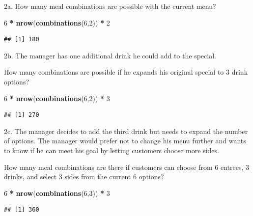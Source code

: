 \documentclass[
]{article}
\newenvironment{Shaded}{\begin{snugshade}}{\end{snugshade}}
\newcommand{\DecValTok}[1]{\textcolor[rgb]{0.00,0.00,0.81}{#1}}
\newcommand{\KeywordTok}[1]{\textcolor[rgb]{0.13,0.29,0.53}{\textbf{#1}}}
\newcommand{\NormalTok}[1]{#1}
\newcommand{\OperatorTok}[1]{\textcolor[rgb]{0.81,0.36,0.00}{\textbf{#1}}}
\newcommand{\StringTok}[1]{\textcolor[rgb]{0.31,0.60,0.02}{#1}}
\begin{document}
2a. How many meal combinations are possible with the current menu?

\begin{Shaded}
\begin{Highlighting}[]
\DecValTok{6} \OperatorTok{*}\StringTok{ }\KeywordTok{nrow}\NormalTok{(}\KeywordTok{combinations}\NormalTok{(}\DecValTok{6}\NormalTok{,}\DecValTok{2}\NormalTok{)) }\OperatorTok{*}\StringTok{ }\DecValTok{2}
\end{Highlighting}
\end{Shaded}

\begin{verbatim}
## [1] 180
\end{verbatim}

2b. The manager has one additional drink he could add to the special.

How many combinations are possible if he expands his original special to
3 drink options?

\begin{Shaded}
\begin{Highlighting}[]
\DecValTok{6} \OperatorTok{*}\StringTok{ }\KeywordTok{nrow}\NormalTok{(}\KeywordTok{combinations}\NormalTok{(}\DecValTok{6}\NormalTok{,}\DecValTok{2}\NormalTok{)) }\OperatorTok{*}\StringTok{ }\DecValTok{3}
\end{Highlighting}
\end{Shaded}

\begin{verbatim}
## [1] 270
\end{verbatim}

2c. The manager decides to add the third drink but needs to expand the
number of options. The manager would prefer not to change his menu
further and wants to know if he can meet his goal by letting customers
choose more sides.

How many meal combinations are there if customers can choose from 6
entrees, 3 drinks, and select 3 sides from the current 6 options?

\begin{Shaded}
\begin{Highlighting}[]
\DecValTok{6} \OperatorTok{*}\StringTok{ }\KeywordTok{nrow}\NormalTok{(}\KeywordTok{combinations}\NormalTok{(}\DecValTok{6}\NormalTok{,}\DecValTok{3}\NormalTok{)) }\OperatorTok{*}\StringTok{ }\DecValTok{3}
\end{Highlighting}
\end{Shaded}

\begin{verbatim}
## [1] 360
\end{verbatim}
\end{document}
